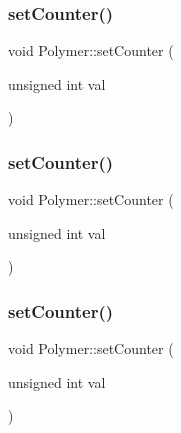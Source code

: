 \subsubsection{\texorpdfstring{set\+Counter()}{setCounter()}\hspace{0.1cm}{\footnotesize\ttfamily [3/10]}}
{\footnotesize\ttfamily void Polymer\+::set\+Counter (\begin{DoxyParamCaption}\item[{unsigned int}]{val }\end{DoxyParamCaption})\hspace{0.3cm}{\ttfamily [inline]}}

\mbox{\label{classPolymer_a7ed6bbe09a570b59f9253d63fd3326d2}} 
\subsubsection{\texorpdfstring{set\+Counter()}{setCounter()}\hspace{0.1cm}{\footnotesize\ttfamily [4/10]}}
{\footnotesize\ttfamily void Polymer\+::set\+Counter (\begin{DoxyParamCaption}\item[{unsigned int}]{val }\end{DoxyParamCaption})\hspace{0.3cm}{\ttfamily [inline]}}

\mbox{\label{classPolymer_a7ed6bbe09a570b59f9253d63fd3326d2}} 
\subsubsection{\texorpdfstring{set\+Counter()}{setCounter()}\hspace{0.1cm}{\footnotesize\ttfamily [5/10]}}
{\footnotesize\ttfamily void Polymer\+::set\+Counter (\begin{DoxyParamCaption}\item[{unsigned int}]{val }\end{DoxyParamCaption})\hspace{0.3cm}{\ttfamily [inline]}}

\mbox{\label{classPolymer_a7ed6bbe09a570b59f9253d63fd3326d2}} 
